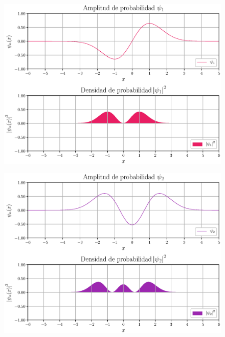 \documentclass[12pt]{beamer}
\begin{document}
\begin{frame}[plain]
\begin{figure}[H]
    \centering
    \includegraphics[scale=0.5]{Imagenes/Funcion_Onda_01.eps}
\end{figure}
\end{frame}
\begin{frame}[plain]
\begin{figure}[H]
    \centering
    \includegraphics[scale=0.5]{Imagenes/Funcion_Onda_02.eps}
\end{figure}
\end{frame}
\end{document}
